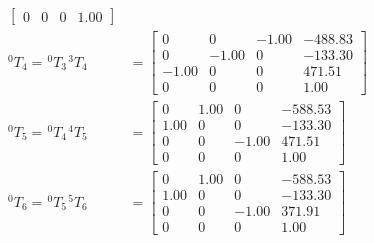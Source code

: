 \begin{equation*}
\begin{split}
\begin{bmatrix}
                                                                          0    & 0     & 0     & 1.00
                                                                      \end{bmatrix}  \\
        ^{0}T_{4} = \hspace{1pt} ^{0}T_{3} \hspace{1pt} ^{3}T_{4} & = \begin{bmatrix}
                                                                          0     & 0     & -1.00 & -488.83 \\
                                                                          0     & -1.00 & 0     & -133.30 \\
                                                                          -1.00 & 0     & 0     & 471.51  \\
                                                                          0     & 0     & 0     & 1.00
                                                                      \end{bmatrix} \\
        ^{0}T_{5} = \hspace{1pt} ^{0}T_{4} \hspace{1pt} ^{4}T_{5} & = \begin{bmatrix}
                                                                          0    & 1.00 & 0     & -588.53 \\
                                                                          1.00 & 0    & 0     & -133.30 \\
                                                                          0    & 0    & -1.00 & 471.51  \\
                                                                          0    & 0    & 0     & 1.00
                                                                      \end{bmatrix}   \\
        ^{0}T_{6} = \hspace{1pt} ^{0}T_{5} \hspace{1pt} ^{5}T_{6} & = \begin{bmatrix}
                                                                          0    & 1.00 & 0     & -588.53 \\
                                                                          1.00 & 0    & 0     & -133.30 \\
                                                                          0    & 0    & -1.00 & 371.91  \\
                                                                          0    & 0    & 0     & 1.00
                                                                      \end{bmatrix}
    \end{split}
\end{equation*}
